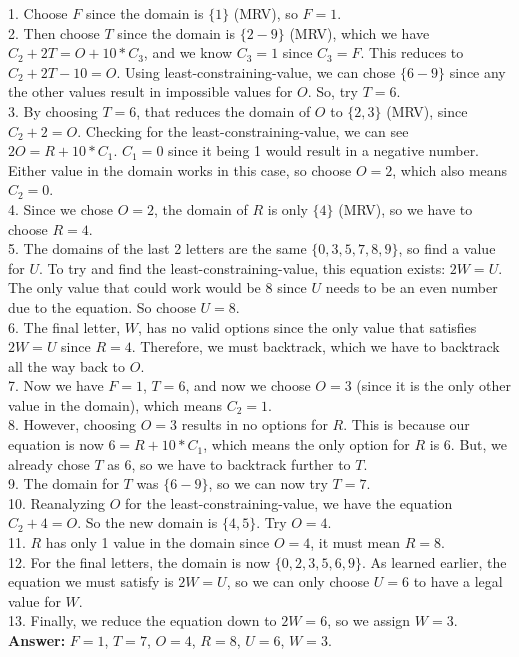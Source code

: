 \documentclass{article}
\begin{document}
\begin{enumerate}
\color{blue}
    1. Choose $F$ since the domain is $\{1\}$ (MRV), so $F = 1$.\\
    2. Then choose $T$ since the domain is $\{2-9\}$ (MRV), which we have $C_2 + 2T = O + 10 * C_3$, and we know $C_3 = 1$ since $C_3 = F$. This reduces to $C_2 + 2T - 10 = O$. Using least-constraining-value, we can chose $\{6-9\}$ since any the other values result in impossible values for $O$. So, try $T = 6$.\\
    3. By choosing $T = 6$, that reduces the domain of $O$ to $\{2, 3\}$ (MRV), since $C_2 + 2 = O$. Checking for the least-constraining-value, we can see $2O = R + 10 * C_1$. $C_1 = 0$ since it being 1 would result in a negative number. Either value in the domain works in this case, so choose $O = 2$, which also means $C_2 = 0$.\\
    4. Since we chose $O = 2$, the domain of $R$ is only $\{4\}$ (MRV), so we have to choose $R = 4$.\\
    5. The domains of the last 2 letters are the same $\{0, 3, 5, 7, 8, 9\}$, so find a value for $U$. To try and find the least-constraining-value, this equation exists: $2W = U$. The only value that could work would be 8 since $U$ needs to be an even number due to the equation. So choose $U = 8$.\\
    6. The final letter, $W$, has no valid options since the only value that satisfies $2W = U$ since $R = 4$. Therefore, we must backtrack, which we have to backtrack all the way back to $O$.\\
    7. Now we have $F = 1$, $T = 6$, and now we choose $O = 3$ (since it is the only other value in the domain), which means $C_2 = 1$.\\
    8. However, choosing $O = 3$ results in no options for $R$. This is because our equation is now $6 = R + 10 * C_1$, which means the only option for $R$ is 6. But, we already chose $T$ as 6, so we have to backtrack further to $T$.\\
    9. The domain for $T$ was $\{6-9\}$, so we can now try $T = 7$.\\
    10. Reanalyzing $O$ for the least-constraining-value, we have the equation $C_2 + 4 = O$. So the new domain is $\{4, 5\}$. Try $O = 4$.\\
    11. $R$ has only 1 value in the domain since $O = 4$, it must mean $R = 8$.\\
    12. For the final letters, the domain is now $\{0, 2, 3, 5, 6, 9\}$. As learned earlier, the equation we must satisfy is $2W = U$, so we can only choose $U = 6$ to have a legal value for $W$.\\
    13. Finally, we reduce the equation down to $2W = 6$, so we assign $W = 3$.\\
    \textbf{Answer:} $F = 1$, $T = 7$, $O = 4$, $R = 8$, $U = 6$, $W = 3$.
\color{black}


\end{enumerate}
\end{document}
